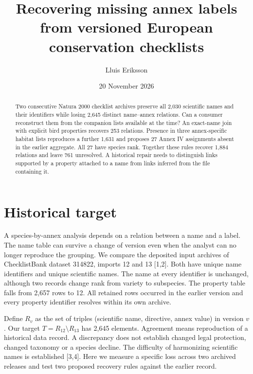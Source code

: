 \documentclass[11pt]{article}
\title{Recovering missing annex labels from versioned European conservation checklists}
\author{Lluis Eriksson}\date{20 November 2026}
\begin{document}
\maketitle
\begin{abstract}
Two consecutive Natura 2000 checklist archives preserve all 2,030 scientific names and their identifiers while losing 2,645 distinct name--annex relations. Can a consumer reconstruct them from the companion lists available at the time? An exact-name join with explicit bird properties recovers 253 relations. Presence in three annex-specific habitat lists reproduces a further 1,631 and proposes 27 Annex IV assignments absent in the earlier aggregate. All 27 have species rank. Together these rules recover 1,884 relations and leave 761 unresolved. A historical repair needs to distinguish links supported by a property attached to a name from links inferred from the file containing it.
\end{abstract}
\section{Historical target}
A species-by-annex analysis depends on a relation between a name and a label. The name table can survive a change of version even when the analyst can no longer reproduce the grouping. We compare the deposited input archives of ChecklistBank dataset 314822, imports 12 and 13 [1,2]. Both have unique name identifiers and unique scientific names. The name at every identifier is unchanged, although two records change rank from variety to subspecies. The property table falls from 2,657 rows to 12. All retained rows occurred in the earlier version and every property identifier resolves within its own archive.

Define $R_v$ as the set of triples (scientific name, directive, annex value) in version $v$. Our target $T=R_{12}\setminus R_{13}$ has 2,645 elements. Agreement means reproduction of a historical data record. A discrepancy does not establish changed legal protection, changed taxonomy or a species decline. The difficulty of harmonizing scientific names is established [3,4]. Here we measure a specific loss across two archived releases and test two proposed recovery rules against the earlier record.
\end{document}
